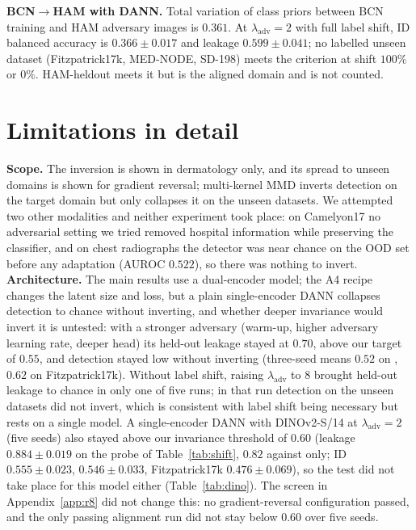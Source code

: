 \documentclass{midl}
\newcommand{\lam}{\lambda_{\mathrm{adv}}}
\begin{document}
\textbf{BCN$\to$HAM with DANN.} Total variation of class priors between BCN training and HAM
adversary images is $0.361$. At $\lam=2$ with full label shift, ID balanced accuracy is
$0.366\pm0.017$ and leakage $0.599\pm0.041$; no labelled unseen dataset (Fitzpatrick17k, MED-NODE,
SD-198) meets the criterion at shift $100\%$ or $0\%$. HAM-heldout meets it but is the aligned
domain and is not counted.

\FloatBarrier
\section{Limitations in detail}
\label{app:limits}

\textbf{Scope.} The inversion is shown in dermatology only, and its spread to unseen domains
is shown for gradient reversal; multi-kernel MMD inverts detection on the target domain but
only collapses it on the unseen datasets. We attempted two other
modalities and neither experiment took place: on Camelyon17 no adversarial setting we tried
removed hospital information while preserving the classifier, and on chest radiographs the
detector was near chance on the OOD set before any adaptation (AUROC $0.522$), so there was
nothing to invert. \textbf{Architecture.} The main results use a dual-encoder model; the A4
recipe changes the latent size and loss, but a plain single-encoder DANN collapses detection
to chance without inverting, and whether deeper invariance would invert it is untested: with a stronger adversary
(warm-up, higher adversary learning rate, deeper head) its held-out leakage stayed at
$0.70$, above our target of $0.55$, and detection stayed low without inverting (three-seed means $0.52$ on
\texttt{}, $0.62$ on Fitzpatrick17k). Without label shift, raising $\lam$ to $8$ brought held-out leakage to chance in only one
of five runs; in that run detection on the unseen datasets did not invert, which is consistent
with label shift being necessary but rests on a single model. A single-encoder DANN with DINOv2-S/14 at $\lam=2$ (five seeds) also stayed above our invariance
threshold of $0.60$ (leakage $0.884\pm0.019$ on the probe of Table~\ref{tab:shift}, $0.82$ against \texttt{} only; ID $0.555\pm0.023$, \texttt{}
$0.546\pm0.033$, Fitzpatrick17k $0.476\pm0.069$), so the test did not take place for this model either (Table~\ref{tab:dino}). The screen in
Appendix~\ref{app:r8} did not change this: no gradient-reversal configuration passed, and the
only passing alignment run did not stay below $0.60$ over five seeds.
\end{document}
